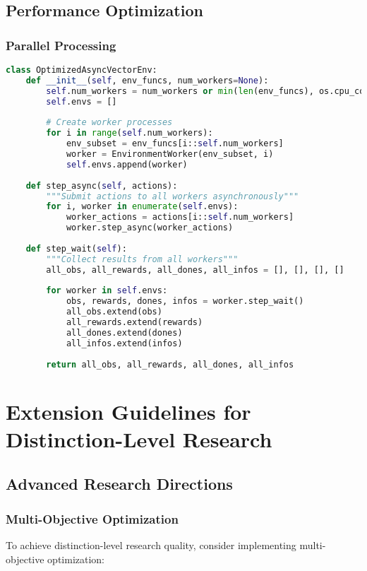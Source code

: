 \documentclass[12pt,a4paper]{article}
\begin{document}
\subsection{Performance Optimization}

\subsubsection{Parallel Processing}
\begin{lstlisting}[language=Python, caption=Parallel Environment Optimization]
class OptimizedAsyncVectorEnv:
    def __init__(self, env_funcs, num_workers=None):
        self.num_workers = num_workers or min(len(env_funcs), os.cpu_count())
        self.envs = []
        
        # Create worker processes
        for i in range(self.num_workers):
            env_subset = env_funcs[i::self.num_workers]
            worker = EnvironmentWorker(env_subset, i)
            self.envs.append(worker)
    
    def step_async(self, actions):
        """Submit actions to all workers asynchronously"""
        for i, worker in enumerate(self.envs):
            worker_actions = actions[i::self.num_workers]
            worker.step_async(worker_actions)
    
    def step_wait(self):
        """Collect results from all workers"""
        all_obs, all_rewards, all_dones, all_infos = [], [], [], []
        
        for worker in self.envs:
            obs, rewards, dones, infos = worker.step_wait()
            all_obs.extend(obs)
            all_rewards.extend(rewards)
            all_dones.extend(dones)
            all_infos.extend(infos)
        
        return all_obs, all_rewards, all_dones, all_infos
\end{lstlisting}

\section{Extension Guidelines for Distinction-Level Research}

\subsection{Advanced Research Directions}

\subsubsection{Multi-Objective Optimization}
To achieve distinction-level research quality, consider implementing multi-objective optimization:
\end{document}
